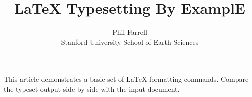 \documentclass[11pt]{article}
\begin{document}
\title{LaTeX Typesetting By ExamplE}
\author{Phil Farrell\\
Stanford University School of Earth Sciences}
\maketitle
This article demonstrates a basic set of LaTeX formatting commands.
Compare the typeset output side-by-side with the input document.
\end{document}
